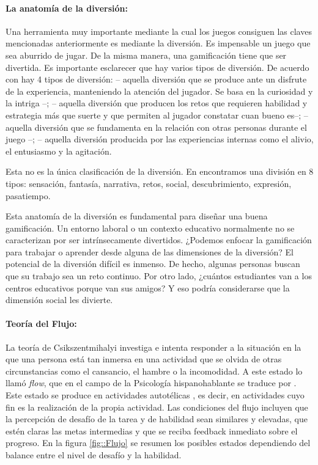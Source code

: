 \paragraph{La anatomía de la diversión: }

Una herramienta muy importante mediante la cual los juegos consiguen las claves mencionadas anteriormente es mediante la diversión.
%
Es impensable un juego que sea aburrido de jugar.
%
De la misma manera, una gamificación tiene que ser divertida.
%
Es importante esclarecer que hay varios tipos de diversión.
%
De acuerdo con \cite{whyweplaygames} hay 4 tipos de diversión: 
%
 -- aquella diversión que se produce ante un disfrute de la experiencia, manteniendo la atención del jugador. Se basa en la curiosidad y la intriga --;
%
\label{kindsoffun}
  -- aquella diversión que producen los retos que requieren habilidad y estrategia más que suerte y que permiten al jugador constatar cuan bueno es--;
%
 -- aquella diversión que se fundamenta en la relación con otras personas durante el juego --;
%
 -- aquella diversión producida por las experiencias internas como el alivio, el entusiasmo y la agitación.

Esta no es la única clasificación de la diversión.
%
En \cite{MDA} encontramos una división en 8 tipos: sensación, fantasía, narrativa, retos, social, descubrimiento, expresión, pasatiempo.
%
\label{AnatomyOfFun}
%

Esta anatomía de la diversión es fundamental para diseñar una buena gamificación.
%
Un entorno laboral o un contexto educativo normalmente no se caracterizan por ser intrínsecamente divertidos.
%
¿Podemos enfocar la gamificación para trabajar o aprender desde alguna de las dimensiones de la diversión? 
%
El potencial de la diversión difícil es inmenso. 
%
De hecho, algunas personas buscan que su trabajo sea un reto continuo.
%
Por otro lado, ¿cuántos estudiantes van a los centros educativos porque van sus amigos?
%
Y eso podría considerarse que la dimensión social les divierte.


\paragraph{Teoría del Flujo:} La teoría de Csikszentmihalyi investiga e intenta responder a la situación en la que una persona está tan inmersa en una actividad que se olvida de otras circunstancias como el cansancio, el hambre o la incomodidad.
%
A este estado lo llamó \textit{flow}, que en el campo de la Psicología hispanohablante se traduce por .
%
Este estado se produce en actividades autotélicas \label{autotel}, es decir, en actividades cuyo fin es la realización de la propia actividad.
%
Las condiciones del flujo incluyen que la percepción de desafío de la tarea y de habilidad sean similares y elevadas, que estén claras las metas intermedias y que se reciba feedback inmediato sobre el progreso\cite{Flow}.
%
En la figura \ref{fig::Flujo} se resumen los posibles estados dependiendo del balance entre el nivel de desafío y la habilidad.

